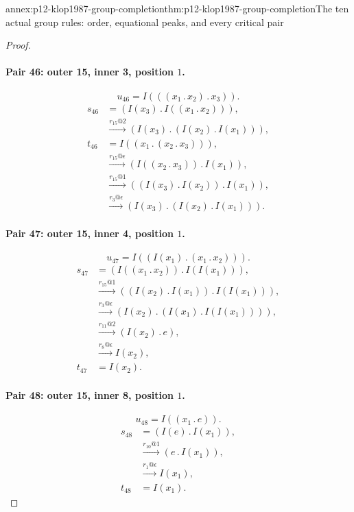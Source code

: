 \begin{annexitem}{annex:p12-klop1987-group-completion}{thm:p12-klop1987-group-completion}{The ten actual group rules: order, equational peaks, and every critical pair}
\begin{proof}
\paragraph{Pair 46: outer 15, inner 3, position \(1\).}
\[
 u_{46}=I(((x_{1}\mathbin{.}x_{2})\mathbin{.}x_{3})).
\]
\begin{align*}
 s_{46}&=(I(x_{3})\mathbin{.}I((x_{1}\mathbin{.}x_{2}))),\\
 &\xrightarrow{r_{15}@2}(I(x_{3})\mathbin{.}(I(x_{2})\mathbin{.}I(x_{1}))),\\
 t_{46}&=I((x_{1}\mathbin{.}(x_{2}\mathbin{.}x_{3}))),\\
 &\xrightarrow{r_{15}@\epsilon}(I((x_{2}\mathbin{.}x_{3}))\mathbin{.}I(x_{1})),\\
 &\xrightarrow{r_{15}@1}((I(x_{3})\mathbin{.}I(x_{2}))\mathbin{.}I(x_{1})),\\
 &\xrightarrow{r_{3}@\epsilon}(I(x_{3})\mathbin{.}(I(x_{2})\mathbin{.}I(x_{1}))).
\end{align*}

\paragraph{Pair 47: outer 15, inner 4, position \(1\).}
\[
 u_{47}=I((I(x_{1})\mathbin{.}(x_{1}\mathbin{.}x_{2}))).
\]
\begin{align*}
 s_{47}&=(I((x_{1}\mathbin{.}x_{2}))\mathbin{.}I(I(x_{1}))),\\
 &\xrightarrow{r_{15}@1}((I(x_{2})\mathbin{.}I(x_{1}))\mathbin{.}I(I(x_{1}))),\\
 &\xrightarrow{r_{3}@\epsilon}(I(x_{2})\mathbin{.}(I(x_{1})\mathbin{.}I(I(x_{1})))),\\
 &\xrightarrow{r_{11}@2}(I(x_{2})\mathbin{.}e),\\
 &\xrightarrow{r_{8}@\epsilon}I(x_{2}),\\
 t_{47}&=I(x_{2}).
\end{align*}

\paragraph{Pair 48: outer 15, inner 8, position \(1\).}
\[
 u_{48}=I((x_{1}\mathbin{.}e)).
\]
\begin{align*}
 s_{48}&=(I(e)\mathbin{.}I(x_{1})),\\
 &\xrightarrow{r_{10}@1}(e\mathbin{.}I(x_{1})),\\
 &\xrightarrow{r_{1}@\epsilon}I(x_{1}),\\
 t_{48}&=I(x_{1}).
\end{align*}


\end{proof}
\end{annexitem}
